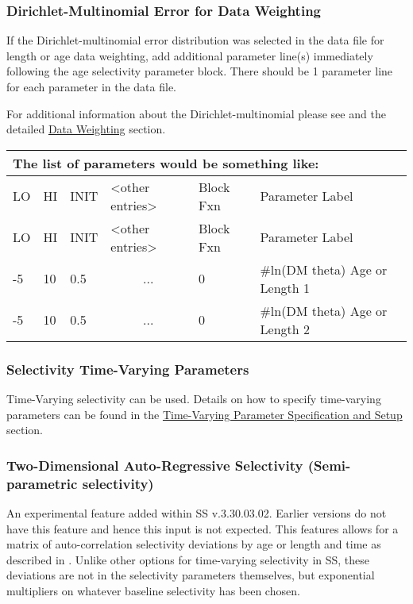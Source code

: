 \hypertarget{Dirichletparameter}{}
\subsubsection{Dirichlet-Multinomial Error for Data Weighting}
If the Dirichlet-multinomial error distribution was selected in the data file for length or age data weighting, add additional parameter line(s) immediately following the age selectivity parameter block. There should be 1 parameter line for each parameter in the data file.

For additional information about the Dirichlet-multinomial please see \citet{thorson-model-based-2017} and the detailed \hyperlink{DataWeight}{Data Weighting} section.

	
\begin{longtable}{p{1cm} p{1cm} p{1cm} p{2.9cm}  p{1.8cm}  p{6.5cm}}
	\multicolumn{6}{l}{The list of parameters would be something like:}\\
	\hline
	LO \Tstrut & HI & INIT  &  <other entries> & Block Fxn & Parameter Label\Bstrut\\
	\hline
	\endfirsthead
	
	\hline
	LO \Tstrut & HI & INIT & <other entries> & Block Fxn & Parameter Label\Bstrut\\
	\hline
	\endhead

	-5   & 10 & 0.5  & \multicolumn{1}{c}{...}  & 0   & \#ln(DM theta) Age or Length 1 \Tstrut\\
	-5   & 10 & 0.5  & \multicolumn{1}{c}{...}  & 0   & \#ln(DM theta) Age or Length 2\Bstrut\\
	\hline
\end{longtable}


\subsubsection{Selectivity Time-Varying Parameters}
Time-Varying selectivity can be used. Details on how to specify time-varying parameters can be found in the \hyperlink{tvOrder}{Time-Varying Parameter Specification and Setup} section.

\subsubsection{Two-Dimensional Auto-Regressive Selectivity (Semi-parametric selectivity)}
An experimental feature added within SS v.3.30.03.02. Earlier versions do not have this feature and hence this input is not expected.  This features allows for a matrix of auto-correlation selectivity deviations by age or length and time as described in \citet{xu-new-2019}. Unlike other options for time-varying selectivity in SS, these deviations are not in the selectivity parameters themselves, but exponential multipliers on whatever baseline selectivity has been chosen.  

